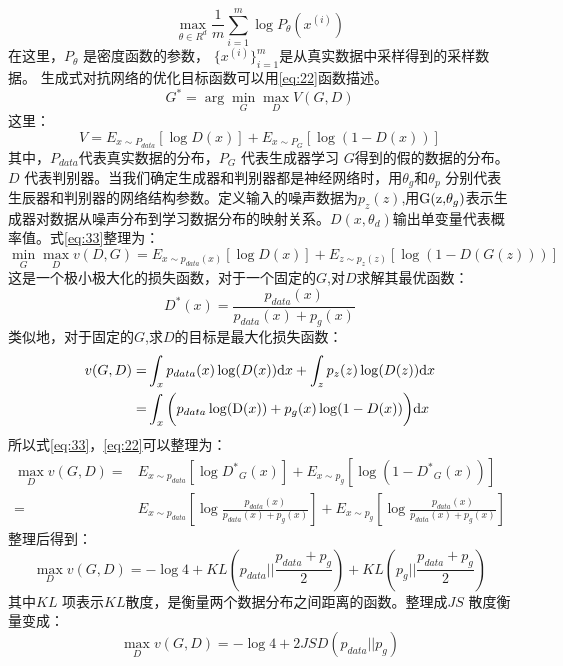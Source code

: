 \begin{equation}
\label{eq:EM}
\max \limits_{\theta\in R^{d}}\frac{1}{m} \sum_{i=1}^m \log P_{\theta}(x^{(i)})
\end{equation}
在这里，$P_{\theta}$ 是密度函数的参数， $\{x^{(i)}\}^{m} _{i=1}$是从真实数据中采样得到的采样数据。
生成式对抗网络的优化目标函数可以用\ref{eq:22}函数描述。
\begin{equation}
\label{eq:22}
G^{*}=\arg \min \limits_{G} \max \limits_{D} V(G,D)
\end{equation}
这里：
\begin{equation}
\label{eq:33}
V=E_{x\sim P_{data}} [\log D(x)]+E_{x\sim P_{G}}[\log (1-D(x))]
\end{equation}
其中，$P_{data}$代表真实数据的分布，$P_{G}$ 代表生成器学习 $G$得到的假的数据的分布。 $D$ 代表判别器。当我们确定生成器和判别器都是神经网络时，用${\theta _g}$和${\theta _p}$ 分别代表生辰器和判别器的网络结构参数。定义输入的噪声数据为$ {p_z}(z)$,用${\rm{G(z,}}{\theta _g}{\rm{)}}$表示生成器对数据从噪声分布到学习数据分布的映射关系。$D(x,{\theta _d})$输出单变量代表概率值。式\ref{eq:33}整理为：
\begin{equation}
\label{eq:44}
\mathop {\min }\limits_G \mathop {\max }\limits_D v(D,G) = {E_{x \sim {p_{data}}(x)}}[\log D(x)] + {E_{z \sim {p_z}(z)}}[\log (1 - D(G(z)))]
\end{equation}
 这是一个极小极大化的损失函数，对于一个固定的$G$,对$D$求解其最优函数：
 \begin{equation}
 \label{eq:34}
 {D^*}(x) = \frac{{{p_{data}}(x)}}{{{p_{data}}(x) + {p_g}(x)}}
\end{equation}
 类似地，对于固定的$G$,求$D$的目标是最大化损失函数：
\begin{equation}\label{eq:36}
\begin{split}
v(G,D) =& \int_x {{p_{data}}(x)\log (D(x))}\mathrm{d}x + \int_z {{p_z}(z)\log (D(z))}\mathrm{d}x  \\
=&  \int_x \bigg( {{p_{data}}\log ({\rm{D}}(x)) + {p_g}(x)\log (1 - D(x))\bigg)}\mathrm{d}x 
\end{split}
\end{equation}
所以式\ref{eq:33}，\ref{eq:22}可以整理为：
\begin{equation}
\label{eq:35}
\begin{split}
\mathop {\max }\limits_D v(G,D) =& {E_{x \sim {p_{data}}}}[\log {D^*}_G(x)] + {E_{x \sim {p_g}}}[\log (1 - {D^*}_G(x))] \\
=& {E_{x \sim {p_{data}}}}[\log \frac{{{p_{data}}(x)}}{{{p_{data}}(x) + {p_g}(x)}}] + {E_{x \sim {p_g}}}[\log \frac{{{p_{data}}(x)}}{{{p_{data}}(x) + {p_g}(x)}}]
\end{split}
\end{equation}
整理后得到：
\begin{equation}
\label{eq:37}
\mathop {\max }\limits_D v(G,D) =  - \log 4 + KL({p_{data}}||\frac{{{p_{data}} + {p_g}}}{2}) + KL({p_g}||\frac{{{p_{data}} + {p_g}}}{2})
\end{equation}
其中$KL$ 项表示$KL$散度\cite{joyce2011kullback}，是衡量两个数据分布之间距离的函数。整理成$ JS $ 散度衡量变成：
\begin{equation}
\label{eq:38}
\mathop {\max }\limits_D v(G,D) =  - \log 4 + 2JSD({p_{data}}||{p_g})
\end{equation}

